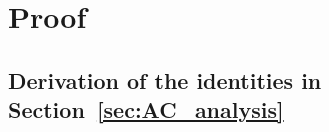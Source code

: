 \documentclass[12pt]{article}
\newcommand{\E}{\mathbb{E}}
\newcommand{\1}{\mathbf{1}}
\theoremstyle{plain}
\theoremstyle{definition}
\theoremstyle{remark}
\theoremstyle{plain}
\theoremstyle{remark}
\theoremstyle{plain}
\theoremstyle{plain}
\theoremstyle{plain}
\numberwithin{equation}{section}
\begin{document}
\section{Proof}

\subsection{Derivation of the identities in Section~\ref{sec:AC_analysis}} \label{sec:autocorrelation_computation}

%
%
\end{document}
